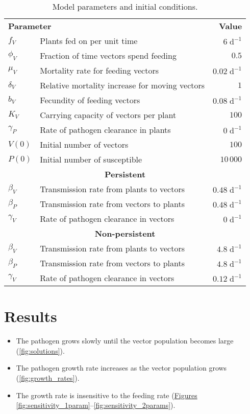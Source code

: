\documentclass{article}
\begin{document}
\begin{table}
  \centering
  \begin{tabular}{llr}
    \multicolumn{2}{l}{\textbf{Parameter}}
    & \multicolumn{1}{r}{\textbf{Value}}
    \\
    $f_V$ & Plants fed on per unit time & $6\;\text{d}^{-1}$
    \\
    $\phi_V$ & Fraction of time vectors spend feeding & $0.5$
    \\
    $\mu_V$ & Mortality rate for feeding vectors & $0.02\;\text{d}^{-1}$
    \\
    $\delta_V$ & Relative mortality increase for moving vectors & $1$
    \\
    $b_V$ & Fecundity of feeding vectors & $0.08\;\text{d}^{-1}$
    \\
    $K_V$ & Carrying capacity of vectors per plant & $100$
    \\
    $\gamma_P$ & Rate of pathogen clearance in plants & $0\;\text{d}^{-1}$
    \\
    $V(0)$ & Initial number of vectors & $100$
    \\
    $P(0)$ & Initial number of susceptible & $10\,000$
    \\
    \multicolumn{3}{c}{\textbf{Persistent}}
    \\
    $\beta_V$ & Transmission rate from plants to vectors & $0.48\;\text{d}^{-1}$
    \\
    $\beta_P$ & Transmission rate from vectors to plants & $0.48\;\text{d}^{-1}$
    \\
    $\gamma_V$ & Rate of pathogen clearance in vectors & $0\;\text{d}^{-1}$
    \\
    \multicolumn{3}{c}{\textbf{Non-persistent}}
    \\
    $\beta_V$ & Transmission rate from plants to vectors & $4.8\;\text{d}^{-1}$
    \\
    $\beta_P$ & Transmission rate from vectors to plants & $4.8\;\text{d}^{-1}$
    \\
    $\gamma_V$ & Rate of pathogen clearance in vectors & $0.12\;\text{d}^{-1}$
  \end{tabular}
  \caption{Model parameters and initial conditions.}
  \label{params}
\end{table}


\section{Results}

\begin{itemize}
\item The pathogen grows slowly until the vector population becomes
  large (\autoref{fig:solutions}).

\item The pathogen growth rate increases as the vector population
  grows (\autoref{fig:growth_rates}).

\item The growth rate is insensitive to the feeding rate
  (\hyperref[fig:sensitivity_1param]{Figures
    \ref*{fig:sensitivity_1param}}--\ref{fig:sensitivity_2params}).
\end{itemize}
\end{document}
